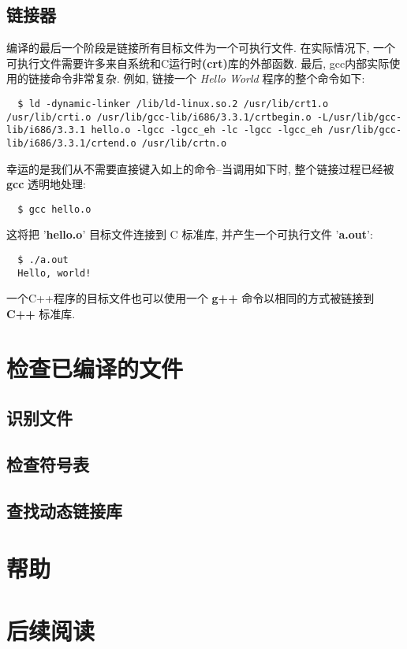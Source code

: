 \documentclass[lang=cn,12pt,newtx,scheme=chinese]{elegantbook}
\begin{document}
\section{链接器}
编译的最后一个阶段是链接所有目标文件为一个可执行文件. 在实际情况下, 一个可执行文件需要许多来自系统和C运行时\textbf{(crt)}库的外部函数. 最后, gcc内部实际使用的链接命令非常复杂. 例如, 链接一个 \textit{Hello World} 程序的整个命令如下:
\begin{lstlisting}
  $ ld -dynamic-linker /lib/ld-linux.so.2 /usr/lib/crt1.o /usr/lib/crti.o /usr/lib/gcc-lib/i686/3.3.1/crtbegin.o -L/usr/lib/gcc-lib/i686/3.3.1 hello.o -lgcc -lgcc_eh -lc -lgcc -lgcc_eh /usr/lib/gcc-lib/i686/3.3.1/crtend.o /usr/lib/crtn.o
\end{lstlisting}

  幸运的是我们从不需要直接键入如上的命令--当调用如下时, 整个链接过程已经被 \textbf{gcc} 透明地处理: 

\begin{lstlisting}
  $ gcc hello.o
\end{lstlisting}

  这将把 '\textbf{hello.o}' 目标文件连接到 C 标准库, 并产生一个可执行文件 '\textbf{a.out}':

\begin{lstlisting}
  $ ./a.out
  Hello, world!
\end{lstlisting}

  一个C++程序的目标文件也可以使用一个 \textbf{g++} 命令以相同的方式被链接到 \textbf{C++} 标准库.

\chapter{检查已编译的文件}
\section{识别文件}
\section{检查符号表}
\section{查找动态链接库}

\chapter{帮助}

\chapter*{后续阅读}
\end{document}
